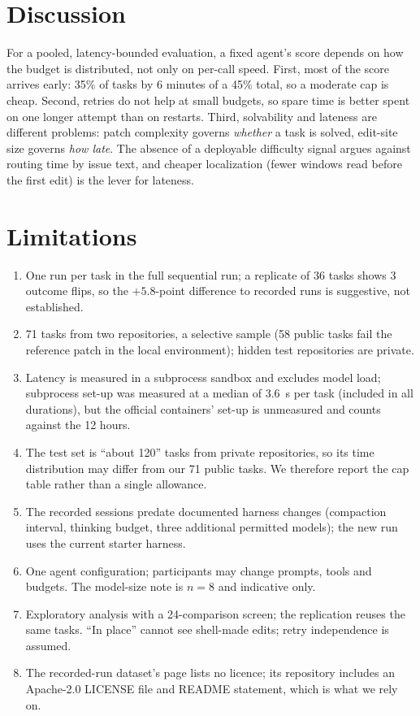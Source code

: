 \documentclass[10pt,twocolumn]{article}
\begin{document}
\section{Discussion}
For a pooled, latency-bounded evaluation, a fixed agent's score depends on how the budget is distributed, not only on per-call speed. First, most of the score arrives early: 35\% of tasks by 6 minutes of a 45\% total, so a moderate cap is cheap. Second, retries do not help at small budgets, so spare time is better spent on one longer attempt than on restarts. Third, solvability and lateness are different problems: patch complexity governs \emph{whether} a task is solved, edit-site size governs \emph{how late}. The absence of a deployable difficulty signal argues against routing time by issue text, and cheaper localization (fewer windows read before the first edit) is the lever for lateness.

\section{Limitations}
\begin{enumerate}
\item One run per task in the full sequential run; a replicate of 36 tasks shows 3 outcome flips, so the $+5.8$-point difference to recorded runs is suggestive, not established.
\item 71 tasks from two repositories, a selective sample (58 public tasks fail the reference patch in the local environment); hidden test repositories are private.
\item Latency is measured in a subprocess sandbox and excludes model load; subprocess set-up was measured at a median of 3.6~s per task (included in all durations), but the official containers' set-up is unmeasured and counts against the 12 hours.
\item The test set is ``about 120'' tasks from private repositories, so its time distribution may differ from our 71 public tasks. We therefore report the cap table rather than a single allowance.
\item The recorded sessions predate documented harness changes (compaction interval, thinking budget, three additional permitted models); the new run uses the current starter harness.
\item One agent configuration; participants may change prompts, tools and budgets. The model-size note is $n=8$ and indicative only.
\item Exploratory analysis with a 24-comparison screen; the replication reuses the same tasks. ``In place'' cannot see shell-made edits; retry independence is assumed.
\item The recorded-run dataset's page lists no licence; its repository includes an Apache-2.0 LICENSE file and README statement, which is what we rely on.
\end{enumerate}
\end{document}
